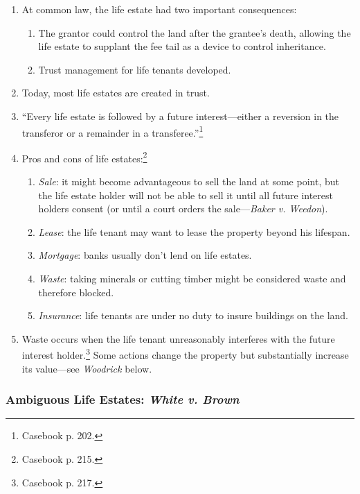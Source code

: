 \begin{enumerate}
    \item At common law, the life estate had two important consequences:
    \begin{enumerate}
        \item The grantor could control the land after the grantee's death, 
        allowing the life estate to supplant the fee tail as a device to 
        control inheritance.
        \item Trust management for life tenants developed.
    \end{enumerate}
    \item Today, most life estates are created in trust.
    \item ``Every life estate is followed by a future interest---either a 
    reversion in the transferor or a remainder in a 
    transferee.''\footnote{Casebook p. 202.}
    \item Pros and cons of life estates:\footnote{Casebook p. 215.}
    \begin{enumerate}
        \item \emph{Sale}: it might become advantageous to sell the land at 
        some point, but the life estate holder will not be able to sell it 
        until all future interest holders consent (or until a court orders the 
        sale---\emph{Baker v. Weedon}).
        \item \emph{Lease}: the life tenant may want to lease the property 
        beyond his lifespan.
        \item \emph{Mortgage}: banks usually don't lend on life estates.
        \item \emph{Waste}: taking minerals or cutting timber might be 
        considered waste and therefore blocked.
        \item \emph{Insurance}: life tenants are under no duty to insure 
        buildings on the land.
    \end{enumerate}
    \item Waste occurs when the life tenant unreasonably interferes with the 
    future interest holder.\footnote{Casebook p. 217.} Some actions change the 
    property but substantially increase its value---see \emph{Woodrick} below.
\end{enumerate}

\subsubsection{Ambiguous Life Estates: \emph{White v. Brown}}

